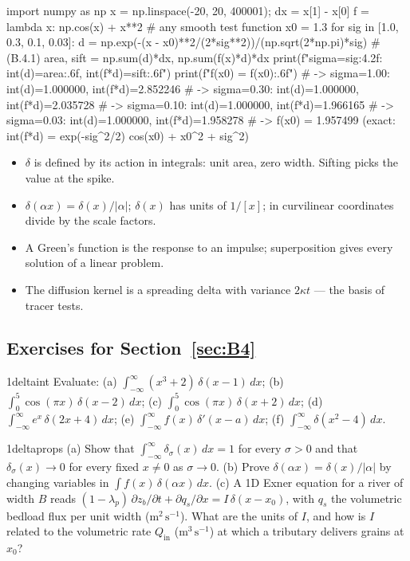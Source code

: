 \documentclass[11pt,letterpaper]{article}
\numberwithin{equation}{section}
\begin{document}
\begin{pycode}
import numpy as np
x = np.linspace(-20, 20, 400001); dx = x[1] - x[0]
f = lambda x: np.cos(x) + x**2          # any smooth test function
x0 = 1.3
for sig in [1.0, 0.3, 0.1, 0.03]:
    d = np.exp(-(x - x0)**2/(2*sig**2))/(np.sqrt(2*np.pi)*sig)  # (B.4.1)
    area, sift = np.sum(d)*dx, np.sum(f(x)*d)*dx
    print(f"sigma={sig:4.2f}: int(d)={area:.6f}, int(f*d)={sift:.6f}")
print(f"f(x0) = {f(x0):.6f}")
# -> sigma=1.00: int(d)=1.000000, int(f*d)=2.852246
# -> sigma=0.30: int(d)=1.000000, int(f*d)=2.035728
# -> sigma=0.10: int(d)=1.000000, int(f*d)=1.966165
# -> sigma=0.03: int(d)=1.000000, int(f*d)=1.958278
# -> f(x0) = 1.957499  (exact: int(f*d) = exp(-sig^2/2) cos(x0) + x0^2 + sig^2)
\end{pycode}

\begin{remember}
\begin{itemize}
  \item $\delta$ is defined by its action in integrals: unit area, zero width. Sifting picks the value at the spike.
  \item $\delta(\alpha x)=\delta(x)/|\alpha|$; $\delta(x)$ has units of $1/[x]$; in curvilinear coordinates divide by the scale factors.
  \item A Green's function is the response to an impulse; superposition gives every solution of a linear problem.
  \item The diffusion kernel is a spreading delta with variance $2\kappa t$ --- the basis of tracer tests.
\end{itemize}
\end{remember}

\subsection*{Exercises for Section~\ref{sec:B4}}

\begin{exercise}{1}{deltaint}
Evaluate:
(a) $\int_{-\infty}^{\infty}(x^3+2)\,\delta(x-1)\,dx$;\;
(b) $\int_0^5\cos(\pi x)\,\delta(x-2)\,dx$;\;
(c) $\int_0^5\cos(\pi x)\,\delta(x+2)\,dx$;\;
(d) $\int_{-\infty}^{\infty}e^{x}\,\delta(2x+4)\,dx$;\;
(e) $\int_{-\infty}^{\infty}f(x)\,\delta'(x-a)\,dx$;\;
(f) $\int_{-\infty}^{\infty}\delta(x^2-4)\,dx$.
\end{exercise}

\begin{exercise}{1}{deltaprops}
(a) Show that $\int_{-\infty}^\infty\delta_\sigma(x)\,dx=1$ for every $\sigma>0$ and that $\delta_\sigma(x)\to0$ for every fixed
$x\neq0$ as $\sigma\to0$.
(b) Prove $\delta(\alpha x)=\delta(x)/|\alpha|$ by changing variables in $\int f(x)\,\delta(\alpha x)\,dx$.
(c) A 1D Exner equation for a river of width $B$ reads $(1-\lambda_p)\,\partial z_b/\partial t+\partial q_s/\partial x=I\,\delta(x-x_0)$,
with $q_s$ the volumetric bedload flux per unit width ($\mathrm{m^2\,s^{-1}}$). What are the units of $I$, and how is $I$ related
to the volumetric rate $Q_{\mathrm{in}}$ ($\mathrm{m^3\,s^{-1}}$) at which a tributary delivers grains at $x_0$?
\end{exercise}
\end{document}
